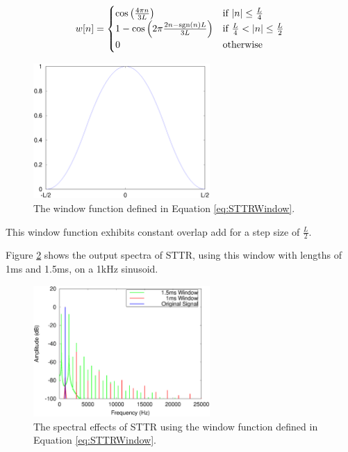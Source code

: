 			\begin{equation}
				w[n] = \begin{cases}
					\cos \left( \frac{4\pi n}{3L} \right) & \text{if $\left|n\right| \leq \frac{L}{4} $} \\
					1 - \cos \left( 2\pi \frac{2n - \operatorname{sgn}(n)L}{3L} \right) &
						\text{if $\frac{L}{4} < \left|n\right| \leq \frac{L}{2}$} \\
					0 & \text{otherwise}
				\end{cases}
				\label{eq:STTRWindow}
			\end{equation}

			\begin{figure}[h!]
				\centering
				\includegraphics[width=0.6\textwidth]{chapter5/Images/STTRWindow.eps}
				\caption{The window function defined in Equation \ref{eq:STTRWindow}.}
				\label{fig:STTRWindow}
			\end{figure}

			This window function exhibits constant overlap add for a step size of $\frac{L}{2}$.

			Figure \ref{fig:STTRSpectra} shows the output spectra of STTR, using this window with lengths of
			1ms and 1.5ms, on a 1kHz sinusoid.

			\begin{figure}[h!]
				\centering
				\includegraphics[width=0.6\textwidth]{chapter5/Images/STTRSpectra.eps}
				\caption{The spectral effects of STTR using the window function defined in Equation
				         \ref{eq:STTRWindow}.}
				\label{fig:STTRSpectra}
			\end{figure}

